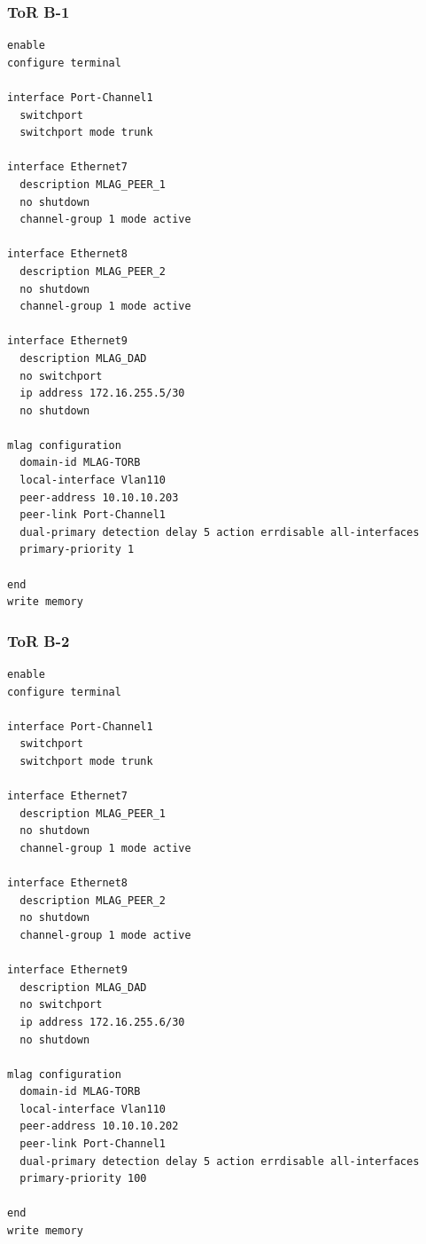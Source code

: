 \subsubsection{ToR B-1}
\begin{lstlisting}[caption={ToR B-1: MLAG peer-link and domain configuration.},basicstyle=\ttfamily\footnotesize,breaklines=true]
enable
configure terminal

interface Port-Channel1
  switchport
  switchport mode trunk

interface Ethernet7
  description MLAG_PEER_1
  no shutdown
  channel-group 1 mode active

interface Ethernet8
  description MLAG_PEER_2
  no shutdown
  channel-group 1 mode active

interface Ethernet9
  description MLAG_DAD
  no switchport
  ip address 172.16.255.5/30
  no shutdown

mlag configuration
  domain-id MLAG-TORB
  local-interface Vlan110
  peer-address 10.10.10.203
  peer-link Port-Channel1
  dual-primary detection delay 5 action errdisable all-interfaces
  primary-priority 1

end
write memory
\end{lstlisting}

\subsubsection{ToR B-2}
\begin{lstlisting}[caption={ToR B-2: MLAG peer-link and domain configuration.},basicstyle=\ttfamily\footnotesize,breaklines=true]
enable
configure terminal

interface Port-Channel1
  switchport
  switchport mode trunk

interface Ethernet7
  description MLAG_PEER_1
  no shutdown
  channel-group 1 mode active

interface Ethernet8
  description MLAG_PEER_2
  no shutdown
  channel-group 1 mode active

interface Ethernet9
  description MLAG_DAD
  no switchport
  ip address 172.16.255.6/30
  no shutdown

mlag configuration
  domain-id MLAG-TORB
  local-interface Vlan110
  peer-address 10.10.10.202
  peer-link Port-Channel1
  dual-primary detection delay 5 action errdisable all-interfaces
  primary-priority 100

end
write memory
\end{lstlisting}

